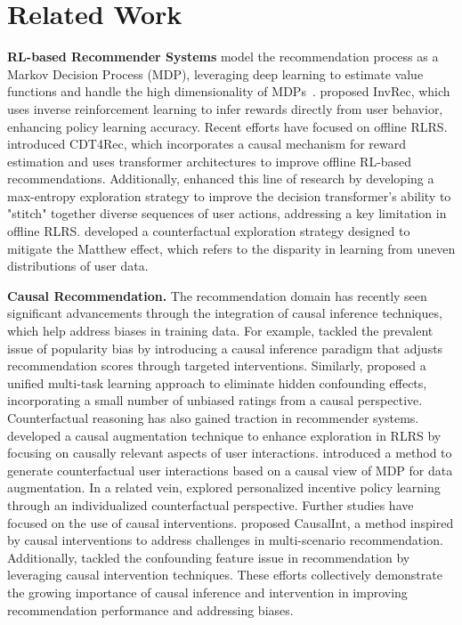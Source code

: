 \section{Related Work}
\vspace{1mm}\noindent\textbf{RL-based Recommender Systems}
model the recommendation process as a Markov Decision Process (MDP), leveraging deep learning to estimate value functions and handle the high dimensionality of MDPs~\cite{mahmood2007learning}. \citet{chen2021generative} proposed InvRec, which uses inverse reinforcement learning to infer rewards directly from user behavior, enhancing policy learning accuracy. Recent efforts have focused on offline RLRS. \citet{wang2023causal} introduced CDT4Rec, which incorporates a causal mechanism for reward estimation and uses transformer architectures to improve offline RL-based recommendations. Additionally, \citet{10.1145/3637528.3671750} enhanced this line of research by developing a max-entropy exploration strategy to improve the decision transformer’s ability to "stitch" together diverse sequences of user actions, addressing a key limitation in offline RLRS. 
\citet{gao2023alleviating} developed a counterfactual exploration strategy designed to mitigate the Matthew effect, which refers to the disparity in learning from uneven distributions of user data. 



\vspace{1mm}\noindent\textbf{Causal Recommendation.}
The recommendation domain has recently seen significant advancements through the integration of causal inference techniques, which help address biases in training data. For example, \citet{zhang2021causal} tackled the prevalent issue of popularity bias by introducing a causal inference paradigm that adjusts recommendation scores through targeted interventions. Similarly, \citet{li2024removing} proposed a unified multi-task learning approach to eliminate hidden confounding effects, incorporating a small number of unbiased ratings from a causal perspective.
Counterfactual reasoning has also gained traction in recommender systems. \citet{chen2023intrinsically} developed a causal augmentation technique to enhance exploration in RLRS by focusing on causally relevant aspects of user interactions. \citet{wang2023plug} introduced a method to generate counterfactual user interactions based on a causal view of MDP for data augmentation. In a related vein, \citet{li2023should} explored personalized incentive policy learning through an individualized counterfactual perspective.
Further studies have focused on the use of causal interventions. \citet{wang2022causalint} proposed CausalInt, a method inspired by causal interventions to address challenges in multi-scenario recommendation. Additionally, \citet{he2023addressing} tackled the confounding feature issue in recommendation by leveraging causal intervention techniques. These efforts collectively demonstrate the growing importance of causal inference and intervention in improving recommendation performance and addressing biases.